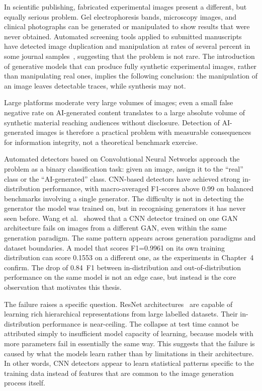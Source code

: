 In scientific publishing, fabricated experimental images present a different, but equally
serious problem. Gel electrophoresis bands, microscopy images, and clinical photographs
can be generated or manipulated to show results that were never obtained. Automated
screening tools applied to submitted manuscripts have detected image duplication and
manipulation at rates of several percent in some journal samples~\cite{bik2016prevalence}, suggesting that the
problem is not rare. The introduction of generative models that can produce fully synthetic experimental images,
rather than manipulating real ones, implies the following conclusion: the manipulation of
an image leaves detectable traces, while synthesis may not.

Large platforms moderate very large volumes of images; even a small false negative
rate on AI-generated content translates to a large absolute volume of synthetic material
reaching audiences without disclosure. Detection of AI-generated images is therefore a
practical problem with measurable consequences for information integrity, not a
theoretical benchmark exercise.

Automated detectors based on Convolutional Neural Networks approach the problem as a
binary classification task: given an image, assign it to the ``real'' class or the
``AI-generated'' class. CNN-based detectors have achieved strong in-distribution
performance, with macro-averaged F1-scores above 0.99 on balanced benchmarks involving
a single generator. The difficulty is not in detecting the generator the model was trained on, 
but in recognising generators it has never seen before. Wang et al.~\cite{wang2020} showed that a 
CNN detector trained on one GAN architecture fails
on images from a different GAN, even within the same generation paradigm. The same
pattern appears across generation paradigms and dataset boundaries. A model that scores
F1=0.9961 on its own training distribution can score 0.1553 on a different one, as the
experiments in Chapter~4 confirm. The drop of 0.84~F1 between in-distribution and
out-of-distribution performance on the same model is not an edge case, but instead 
is the core observation that motivates this thesis.

The failure raises a specific question. ResNet architectures~\cite{he2016} are capable
of learning rich hierarchical representations from large labelled datasets. Their
in-distribution performance is near-ceiling. The collapse at test time cannot be
attributed simply to insufficient model capacity of learning, because models with more parameters
fail in essentially the same way. This suggests that the failure is caused by what the models learn 
rather than by limitations in their architecture. In other words, CNN detectors appear to learn statistical 
patterns specific to the training data instead of features that are common to the image generation process itself.


